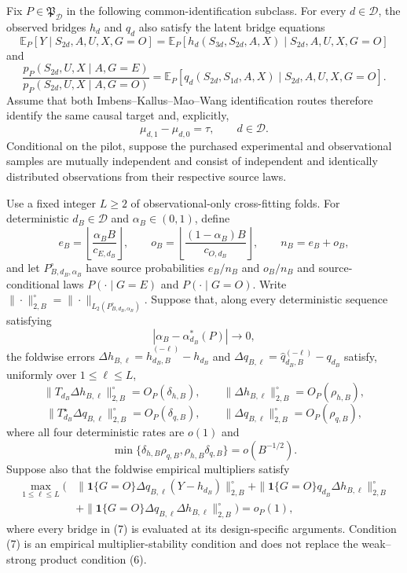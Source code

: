 Fix \(P\in\mathfrak P_{\mathcal D}\) in the following common-identification subclass.  For every \(d\in\mathcal D\), the observed bridges \(h_d\) and \(q_d\) also satisfy the latent bridge equations
\[
 \mathbb E_P[Y\mid S_{2d},A,U,X,G=O]
 =\mathbb E_P[h_d(S_{3d},S_{2d},A,X)\mid S_{2d},A,U,X,G=O]
\]
and
\[
 \frac{p_P(S_{2d},U,X\mid A,G=E)}{p_P(S_{2d},U,X\mid A,G=O)}
 =\mathbb E_P[q_d(S_{2d},S_{1d},A,X)\mid S_{2d},A,U,X,G=O].
\]
Assume that both Imbens--Kallus--Mao--Wang identification routes therefore identify the same causal target and, explicitly,
\[
 \mu_{d,1}-\mu_{d,0}=\tau,
 \qquad d\in\mathcal D.                                    \tag{1}
\]
Conditional on the pilot, suppose the purchased experimental and observational samples are mutually independent and consist of independent and identically distributed observations from their respective source laws.

Use a fixed integer \(L\ge2\) of observational-only cross-fitting folds.  For deterministic \(d_B\in\mathcal D\) and \(\alpha_B\in(0,1)\), define
\[
 e_B=\left\lfloor\frac{\alpha_BB}{c_{E,d_B}}\right\rfloor,
 \qquad
 o_B=\left\lfloor\frac{(1-\alpha_B)B}{c_{O,d_B}}\right\rfloor,
 \qquad n_B=e_B+o_B,                                        \tag{2}
\]
and let \(P_{B,d_B,\alpha_B}^{\circ}\) have source probabilities \(e_B/n_B\) and \(o_B/n_B\) and source-conditional laws \(P(\cdot\mid G=E)\) and \(P(\cdot\mid G=O)\).  Write \(\|\cdot\|_{2,B}^{\circ}=\|\cdot\|_{L_2(P_{B,d_B,\alpha_B}^{\circ})}\).  Suppose that, along every deterministic sequence satisfying
\[
 |\alpha_B-\alpha_{d_B}^*(P)|\longrightarrow0,               \tag{3}
\]
the foldwise errors \(\Delta h_{B,\ell}=\widehat h_{d_B,B}^{(-\ell)}-h_{d_B}\) and \(\Delta q_{B,\ell}=\widehat q_{d_B,B}^{(-\ell)}-q_{d_B}\) satisfy, uniformly over \(1\le\ell\le L\),
\[
 \|T_{d_B}\Delta h_{B,\ell}\|_{2,B}^{\circ}=O_P(\delta_{h,B}),
 \qquad
 \|\Delta h_{B,\ell}\|_{2,B}^{\circ}=O_P(\rho_{h,B}),       \tag{4}
\]
\[
 \|T_{d_B}^{\star}\Delta q_{B,\ell}\|_{2,B}^{\circ}=O_P(\delta_{q,B}),
 \qquad
 \|\Delta q_{B,\ell}\|_{2,B}^{\circ}=O_P(\rho_{q,B}),       \tag{5}
\]
where all four deterministic rates are \(o(1)\) and
\[
 \min\{\delta_{h,B}\rho_{q,B},\rho_{h,B}\delta_{q,B}\}
 =o(B^{-1/2}).                                                \tag{6}
\]
Suppose also that the foldwise empirical multipliers satisfy
\[
\begin{aligned}
 \max_{1\le\ell\le L}\bigl(&
 \|\mathbf 1\{G=O\}\Delta q_{B,\ell}(Y-h_{d_B})\|_{2,B}^{\circ}
 +\|\mathbf 1\{G=O\}q_{d_B}\Delta h_{B,\ell}\|_{2,B}^{\circ}\\
 &+\|\mathbf 1\{G=O\}\Delta q_{B,\ell}\Delta h_{B,\ell}\|_{2,B}^{\circ}
 \bigr)=o_P(1),
\end{aligned}                                                \tag{7}
\]
where every bridge in (7) is evaluated at its design-specific arguments.  Condition (7) is an empirical multiplier-stability condition and does not replace the weak--strong product condition (6).

